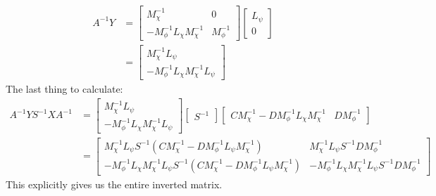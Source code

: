 \documentclass[reqno]{article}
\begin{document}
\begin{equation}
    \begin{split}
        A^{-1} Y
        &=
        \begin{bmatrix}
            M_\chi^{-1} &0 \\
            - M_\phi^{-1} L_\chi M_\chi^{-1} &M_\phi^{-1}
        \end{bmatrix}
        \begin{bmatrix}
            L_\psi \\
            0
        \end{bmatrix} \\
        &=
        \begin{bmatrix}
            M_\chi^{-1} L_\psi \\
            -M_\phi^{-1} L_\chi M_\chi^{-1} L_\psi
        \end{bmatrix}
    \end{split}
\end{equation}
The last thing to calculate:
\begin{equation}
    \begin{split}
        A^{-1} Y S^{-1} X A^{-1}
        &=
        \begin{bmatrix}
            M_\chi^{-1} L_\psi \\
            -M_\phi^{-1} L_\chi M_\chi^{-1} L_\psi
        \end{bmatrix}
        \begin{bmatrix}
            S^{-1}
        \end{bmatrix}
        \begin{bmatrix}
            C M_\chi^{-1} - D M_\phi^{-1} L_\chi M_\chi^{-1} &D M_\phi^{-1}
        \end{bmatrix} \\
        &=
        \begin{bmatrix}
            M_\chi^{-1} L_\psi S^{-1} \left(C M_\chi^{-1} - D M_\phi^{-1} L_\psi M_\chi^{-1}\right)
            & M_\chi^{-1} L_\psi S^{-1} D M_\phi^{-1} \\
            -M_\phi^{-1} L_\chi M_\chi^{-1} L_\psi S^{-1} \left(C M_\chi^{-1} - D M_\phi^{-1} L_\psi M_\chi^{-1}\right)
            & -M_\phi^{-1} L_\chi M_\chi^{-1} L_\psi S^{-1} D M_\phi^{-1}
        \end{bmatrix}
    \end{split}
\end{equation}
This explicitly gives us the entire inverted matrix.
\end{document}
